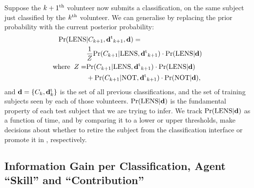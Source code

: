 \documentclass[useAMS,usenatbib,a4paper]{mn2e}
\begin{document}
Suppose the $k+1^{\rm th}$ volunteer now submits a classification, on the same
subject just classified by the $k^{\rm th}$ volunteer. We can generalise
 by replacing the prior probability with the current
posterior probability:
\begin{align}
  \label{eq:app:update}
  {\rm Pr}({\rm LENS} & |C_{k+1},{\mathbf{d}^{\rm t}}_{k+1},{\mathbf{d}}) = \\
  & \frac{1}{Z} {\rm Pr}(C_{k+1}|{\rm LENS},{\mathbf{d}^{\rm t}}_{k+1}) \cdot {\rm Pr}({\rm LENS}|{\mathbf{d}}) \\ \notag
{\rm where}\;\; Z = & {\rm Pr}(C_{k+1}|{\rm LENS},{\mathbf{d}^{\rm t}}_{k+1})\cdot{\rm Pr}({\rm LENS}|{\mathbf{d}}) \\ \notag
      & + {\rm Pr}(C_{k+1}|{\rm NOT},{\mathbf{d}^{\rm t}}_{k+1})\cdot{\rm Pr}({\rm NOT}|{\mathbf{d}}), \notag
\end{align}
and ${\mathbf{d}} = \{C_k,{\mathbf{d}^{\rm t}_k}\}$ is the set of all previous
classifications, and the set of training subjects seen by each of those
volunteers.
${\rm Pr}({\rm LENS}|{\mathbf{d}})$ is the fundamental property of each test subject that
we are trying to infer. We track ${\rm Pr}({\rm LENS}|{\mathbf{d}})$ as a function of time,
and by comparing it to a lower or upper thresholds, make decisions about
whether to retire the subject from the classification interface or
promote it in \Talk, respectively.


\subsection{Information Gain per Classification, Agent ``Skill'' and ``Contribution''}
\label{appendix:swap:examples}
\end{document}
